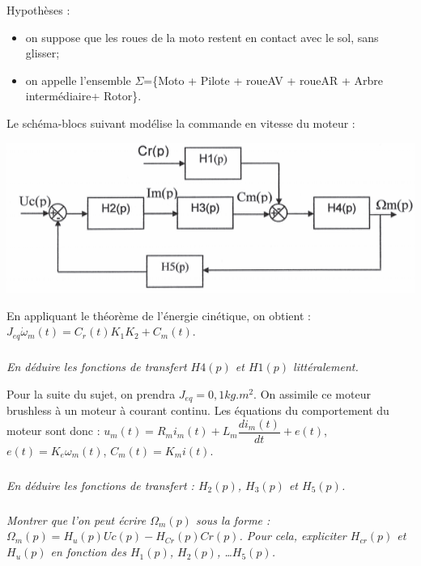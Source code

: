 \documentclass[10pt,fleqn]{article} %
\begin{document}
\begin{multicols}{2}
Hypothèses :
\begin{itemize}
\item on suppose que les roues de la moto restent en contact avec le sol, sans glisser;
\item on appelle l’ensemble $ \Sigma$=\{Moto + Pilote + roueAV + roueAR + Arbre intermédiaire+ Rotor\}.
\end{itemize}
Le schéma-blocs suivant modélise la commande en vitesse du moteur :
\begin{center}
	\includegraphics[width=.9\linewidth]{images/fig_06}
\end{center}


En appliquant le théorème de l'énergie cinétique, on obtient : $J_{eq}\dot{\omega}_m(t)=C_r(t) K_1 K_2 + C_m(t)$.

\subparagraph{}
\textit{En déduire les fonctions de transfert $H4(p)$ et $H1(p)$ littéralement.}
\ifprof
\begin{corrige}
\end{corrige}
\else
\fi

Pour la suite du sujet, on prendra $J_{eq} = {0,1}{kg.m^2}$. On assimile ce moteur brushless à un moteur à courant continu. Les équations du comportement du moteur
sont donc :
$u_m(t) =  R_m i_m(t) + L_m \dfrac{di_m(t)}{dt} + e(t)$, $e (t)= K_e \omega_m (t)$, 
$C_m(t) = K_mi(t)$.



\subparagraph{}
\textit{En déduire les fonctions de transfert : $H_2(p)$, $H_3(p)$ et $H_5(p)$.}
\ifprof
\begin{corrige}
\end{corrige}
\else
\fi


\subparagraph{}
\textit{Montrer que l’on peut écrire  $\Omega_m(p)$ sous la forme :
$\Omega_m(p)=H_u(p)Uc(p)-H_{Cr}(p)Cr(p)$.
Pour cela, expliciter $H_{cr}(p)$ et $H_u(p)$ en fonction des $H_1(p)$, $H_2(p)$, …$H_5(p)$.
}
\ifprof
\begin{corrige}
\end{corrige}
\else
\fi



\end{multicols}
\end{document}
